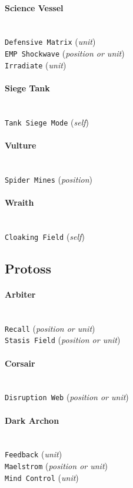 \paragraph{Science Vessel} \mbox{}\\
\verb|Defensive Matrix| (\textit{unit}) \\
\verb|EMP Shockwave| (\textit{position or unit}) \\
\verb|Irradiate| (\textit{unit})

\paragraph{Siege Tank} \mbox{}\\
\verb|Tank Siege Mode| (\textit{self})

\paragraph{Vulture} \mbox{}\\
\verb|Spider Mines| (\textit{position})

\paragraph{Wraith} \mbox{}\\
\verb|Cloaking Field| (\textit{self})

\subsection{Protoss}

\paragraph{Arbiter} \mbox{}\\
\verb|Recall| (\textit{position or unit}) \\
\verb|Stasis Field| (\textit{position or unit})

\paragraph{Corsair} \mbox{}\\
\verb|Disruption Web| (\textit{position or unit})

\paragraph{Dark Archon} \mbox{}\\
\verb|Feedback| (\textit{unit}) \\
\verb|Maelstrom| (\textit{position or unit}) \\
\verb|Mind Control| (\textit{unit})

